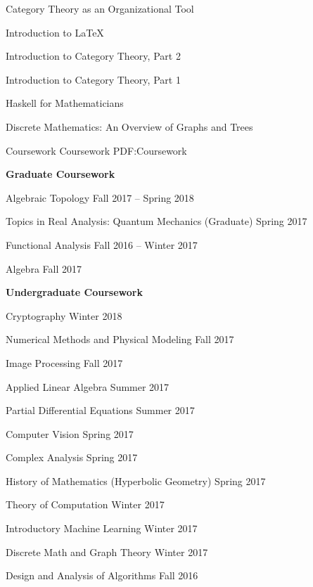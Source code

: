 \documentclass[letterpaper,MMMyyyy,nonstopmode]{simpleresumecv}
\begin{document}
\begin{Body}
\BulletItem
Category Theory as an Organizational Tool
\hfill {}

\BigGap

\BulletItem
Introduction to LaTeX
\hfill {}

\BulletItem
Introduction to Category Theory, Part 2
\hfill {}

\BulletItem
Introduction to Category Theory, Part 1
\hfill {}

\BulletItem
Haskell for Mathematicians
\hfill {}

\BulletItem
Discrete Mathematics: An Overview of Graphs and Trees
\hfill {}


\Section
{Coursework}
{Coursework}
{PDF:Coursework}


\textbf{Graduate Coursework}

\BulletItem
Algebraic Topology
\hfill Fall 2017 -- Spring 2018

\BulletItem
Topics in Real Analysis: Quantum Mechanics (Graduate)
\hfill Spring 2017

\BulletItem
Functional Analysis
\hfill Fall 2016 -- Winter 2017

\BulletItem
Algebra
\hfill Fall 2017
\BigGap

\textbf{Undergraduate Coursework}

\BulletItem
Cryptography
\hfill Winter 2018

\BulletItem
Numerical Methods and Physical Modeling
\hfill Fall 2017

\BulletItem
Image Processing
\hfill Fall 2017

\BigGap
\BulletItem
Applied Linear Algebra
\hfill Summer 2017

\BulletItem
Partial Differential Equations
\hfill Summer 2017

\BulletItem
Computer Vision
\hfill Spring 2017

\BulletItem
Complex Analysis
\hfill Spring 2017

\BulletItem
History of Mathematics (Hyperbolic Geometry)
\hfill Spring 2017

\BulletItem
Theory of Computation
\hfill Winter 2017

\BulletItem
Introductory Machine Learning
\hfill Winter 2017

\BulletItem
Discrete Math and Graph Theory
\hfill Winter 2017

\BulletItem
Design and Analysis of Algorithms
\hfill Fall 2016


\end{Body}
\end{document}
